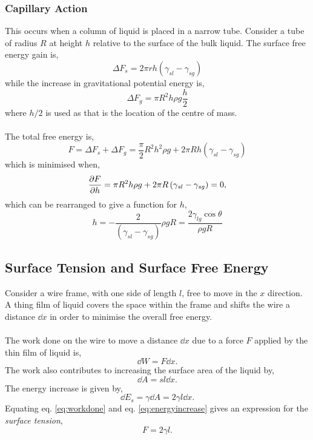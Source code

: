 \documentclass{book}
\begin{document}
\subsubsection{Capillary Action}
This occurs when a column of liquid is placed in a narrow tube. Consider a tube of radius $R$ at height $h$ relative to the surface of the bulk liquid. The surface free energy gain is,
\begin{equation}
	\Delta F_s = 2\pi r h \left(\gamma_{sl} - \gamma_{sg}\right)
\end{equation}
while the increase in gravitational potential energy is,
\begin{equation}
	\Delta F_g = \pi R^2 h \rho g \frac{h}{2}
\end{equation}
where $h/2$ is used as that is the location of the centre of mass.\\\\
The total free energy is,
\begin{equation}
	F = \Delta F_s + \Delta F_g = \frac{\pi}{2}R^2h^2\rho g + 2\pi Rh \left(\gamma_{sl} - \gamma_{sg}\right)
\end{equation}
which is minimised when,
\begin{equation}
	\pdv{F}{h} = \pi R^2 h \rho g + 2\pi R\left(\gamma_{sl} - \gamma_{sg}\right) = 0,
\end{equation}
which can be rearranged to give a function for $h$,
\begin{equation}
	\boxed{h = -\frac{2}{(\gamma_{sl} - \gamma_{sg})}{\rho g R} = \frac{2\gamma_{lg} \cos\theta}{\rho g R}}
\end{equation}
\subsection{Surface Tension and Surface Free Energy}
Consider a wire frame, with one side of length $l$, free to move in the $x$ direction. A thing film of liquid covers the space within the frame and shifts the wire a distance $\dd{x}$ in order to minimise the overall free energy.\\\\
The work done on the wire to move a distance $\dd{x}$ due to a force $F$ applied by the thin film of liquid is,
\begin{equation}
	\dd{W} = F\dd{x}. \label{eq:workdone}
\end{equation}
The work also contributes to increasing the surface area of the liquid by,
\begin{equation}
	\dd{A} = sl \dd{x}.
\end{equation}
The energy increase is given by,
\begin{equation}
	\dd{E}_s = \gamma \dd{A} = 2\gamma l \dd{x}.\label{eq:energyincrease}
\end{equation}
Equating eq. \eqref{eq:workdone} and eq. \eqref{eq:energyincrease} gives an expression for the \textit{surface tension},
\begin{equation}
	\boxed{F = 2\gamma l}.
\end{equation}
\end{document}
